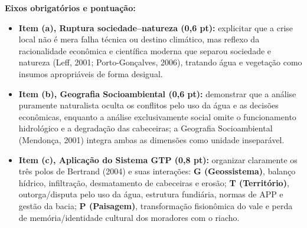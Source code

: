 \begin{boxGabarito}
\textbf{Eixos obrigatórios e pontuação:}
\begin{itemize}[leftmargin=1.5em, itemsep=2pt]
  \item \textbf{Item (a), Ruptura sociedade--natureza (0,6 pt):} explicitar que a crise local não é mera falha técnica ou destino climático, mas reflexo da racionalidade econômica e científica moderna que separou sociedade e natureza (Leff, 2001; Porto-Gonçalves, 2006), tratando água e vegetação como insumos apropriáveis de forma desigual.
  \item \textbf{Item (b), Geografia Socioambiental (0,6 pt):} demonstrar que a análise puramente naturalista oculta os conflitos pelo uso da água e as decisões econômicas, enquanto a análise exclusivamente social omite o funcionamento hidrológico e a degradação das cabeceiras; a Geografia Socioambiental (Mendonça, 2001) integra ambas as dimensões como unidade inseparável.
  \item \textbf{Item (c), Aplicação do Sistema GTP (0,8 pt):} organizar claramente os três polos de Bertrand (2004) e suas interações: \textbf{G (Geossistema)}, balanço hídrico, infiltração, desmatamento de cabeceiras e erosão; \textbf{T (Território)}, outorga/disputa pelo uso da água, estrutura fundiária, normas de APP e gestão da bacia; \textbf{P (Paisagem)}, transformação fisionômica do vale e perda de memória/identidade cultural dos moradores com o riacho.
\end{itemize}
\end{boxGabarito}

